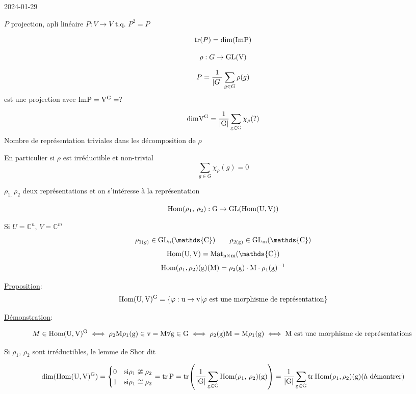 


2024-01-29

\begin{tcolorbox}[title=Rappels]
	
	$P$ projection, apli linéaire $P: V \to V$ t.q. $P^{2}= P$
	
	
	\[ \tr(P) = \rm{dim}(\rm{Im}P) \]
	
	\[ \rho: G \to \rm{GL}(V) \]
	
	\[ P = \frac{1}{\abs{G}} \sum_{g\in G} \rho(g)   \]
	est une projection avec $\rm{Im}P = V^{G}= ?$
	
	\[ \rm{dim} V^{G}= \frac{1}{\abs{G}} \sum_{g \in G} \chi_{\rho}(?)  \]
	Nombre de représentation triviales dans les décomposition de $\rho$
	
	En particulier si $\rho$  est irréductible et non-trivial \[ \sum_{g \in G} \chi_{\rho} (g) = 0 \]
	 
\end{tcolorbox}

$\rho_{1,\,} \rho_2$ deux représentations et on s'intéresse à la représentation 

\[ \rm{Hom}(\rho_1,\, \rho_2 ): G \to \rm{GL}(\rm{Hom}(U,V)) \]

\begin{tcolorbox}[title=Rappel ]
	 Si $U = \mathds{C}^n,\, V = \mathds{C}^m$
	 \[ \rho_{1(g)} \in \rm{GL}_n (\mathds{C})\qquad \rho_{2(g)} \in \rm{GL}_m (\mathds{C})  \]
	 \[ \rm{Hom}(U,V) = \rm{Mat}_{n \times m}(\mathds{C}) \]
	 \[ \rm{Hom}(\rho_1 ,\rho_2 )(g) (M) = \rho_2 (g) \cdot M \cdot \rho_1 (g)^{-1}  \]
\end{tcolorbox}


\underline{Proposition}: 
\[ \rm{Hom}(U,V)^G  = \{ \varphi: u \to v | \text{$\varphi$ est une morphisme de représentation}  \} \]


\underline{Démonstration}:

\[ M \in \rm{Hom}(U,V)^G \iff \rho_2 M \rho_1 (g) \in v = M  \forall g \in G \iff \rho_2(g) M = M \rho_1 (g) \iff M \text{ est une morphisme de représentations } \]


Si $\rho_1,\, \rho_2$ sont irréductibles, le lemme de Shor dit 

\[ \rm{dim}(\rm{Hom}(U,V)^G ) = \begin{cases} 0 & \text{si} \rho_1 \ncong \rho_2 \\ 1 & \text{si} \rho_1 \cong \rho_2 
	
\end{cases} = \tr P = \tr( \frac{1}{\abs{G}} \sum_{g \in G} \rm{Hom}(\rho_1 ,\, \rho_2 )(g)  ) =  \frac{1}{\abs{G}} \sum_{g \in G} \tr \rm{Hom} (\rho_{1},  \rho_2 )(g) (\text{à démontrer} )\]


